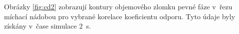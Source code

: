 Obrázky \ref{fig:cd2} zobrazují kontury objemového zlomku pevné fáze v~řezu míchací nádobou pro vybrané korelace koeficientu odporu. Tyto údaje byly získány v~čase simulace \SI{2}{\second}. 
\begin{figure}[h!]
 \centering

  \qquad             

\end{figure}
